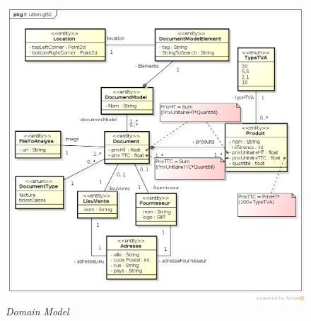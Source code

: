 \begin{figure}[!h]
	\begin{center}
		\includegraphics[scale = 0.4]{img/domainModel.png}
	\end{center}
	\caption{\it Domain Model}
	\label{domainModel}
\end{figure}

